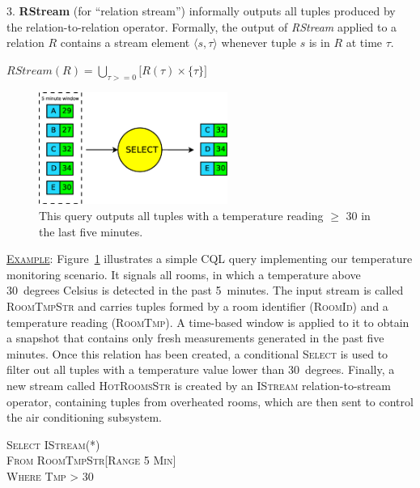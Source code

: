 3. \textbf{RStream} (for ``relation stream'') informally outputs all tuples produced by the
relation-to-relation operator. Formally, the output of \textit{RStream} applied to a relation $R$
contains a stream element $\langle s, \tau \rangle$ whenever tuple $s$ is in $R$ at time $\tau$.

\begin{center}
	$RStream(R) = \bigcup_{\tau>=0}\Big[R(\tau)\times\{\tau\}\Big]$ %
\end{center}	

\begin{figure}[b]
	\centering
	\includegraphics[width=0.55\textwidth]{img/tesi/cql-example} %
	\caption{This query outputs all tuples with a temperature reading $\geq$ 30 in the last five minutes.}
	\label{fig:cql-example}
\end{figure}
\vspace{15pt}
\underline{\textsc{Example}}: Figure~\ref{fig:cql-example} illustrates a simple CQL query implementing
our temperature monitoring scenario. It signals all rooms, in which a temperature above 30~degrees
Celsius is detected in the past 5~minutes. The input stream is called \textsc{RoomTmpStr} and carries
tuples formed by a room identifier (\textsc{RoomId}) and a temperature reading (\textsc{RoomTmp}). A time-based window
is applied to it to obtain a snapshot that contains only fresh measurements generated in the past five
minutes. Once this relation has been created, a conditional \textsc{Select} is used to filter
out all tuples with a temperature value lower than 30~degrees. Finally, a new stream called
\textsc{HotRoomsStr} is created by an \textsc{IStream} relation-to-stream operator, containing tuples
from overheated rooms, which are then sent to control the air conditioning subsystem.
\vspace{15pt}

\tab \textsc{Select IStream(*)} \\
\tab \textsc{From RoomTmpStr[Range 5 Min]} \\
\tab \textsc{Where Tmp > 30} \\

